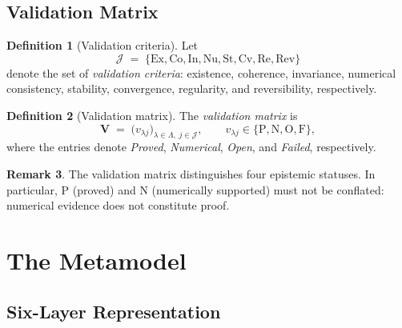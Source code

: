 \documentclass[11pt,a4paper]{article}
\theoremstyle{definition}
\newtheorem{definition}{Definition}[section]
\newtheorem{remark}[definition]{Remark}
\theoremstyle{plain}
\newcommand{\Lam}{\Lambda}
\newcommand{\Vmat}{\mathbf{V}}
\newcommand{\Jset}{\mathcal{J}}
\begin{document}
\subsection{Validation Matrix}

\begin{definition}[Validation criteria]
Let
\[
  \Jset \;=\;
  \{\mathrm{Ex},\mathrm{Co},\mathrm{In},\mathrm{Nu},\mathrm{St},
    \mathrm{Cv},\mathrm{Re},\mathrm{Rev}\}
\]
denote the set of \emph{validation criteria}: existence, coherence,
invariance, numerical consistency, stability, convergence, regularity,
and reversibility, respectively.
\end{definition}

\begin{definition}[Validation matrix]
The \emph{validation matrix} is
\[
  \Vmat \;=\;
  \bigl(v_{\lambda j}\bigr)_{\lambda \in \Lam,\; j \in \Jset},
  \qquad
  v_{\lambda j} \in \{\mathrm{P},\mathrm{N},\mathrm{O},\mathrm{F}\},
\]
where the entries denote \emph{Proved}, \emph{Numerical},
\emph{Open}, and \emph{Failed}, respectively.
\end{definition}

\begin{remark}
The validation matrix distinguishes four epistemic statuses. In
particular, $\mathrm{P}$ (proved) and $\mathrm{N}$ (numerically
supported) must not be conflated: numerical evidence does not
constitute proof.
\end{remark}

\section{The Metamodel}\label{sec:metamodel}

\subsection{Six-Layer Representation}
\end{document}
